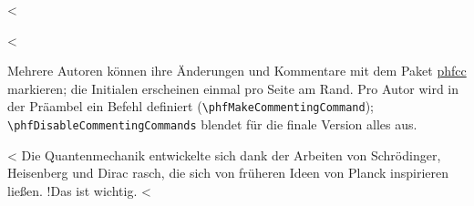 

<%

<%

Mehrere Autoren können ihre Änderungen und Kommentare mit dem Paket \href{https://ctan.org/pkg/phfcc}{phfcc} markieren; die Initialen erscheinen einmal pro Seite am Rand.
Pro Autor wird in der Präambel ein Befehl definiert (\verb|\phfMakeCommentingCommand|); \verb|\phfDisableCommentingCommands| blendet für die finale Version alles aus.

<%
Die Quantenmechanik entwickelte sich dank der Arbeiten von Schrödinger, Heisenberg und Dirac rasch,
die sich von früheren Ideen von Planck   inspirieren ließen.
 \FA!{Das ist wichtig.}
<%
